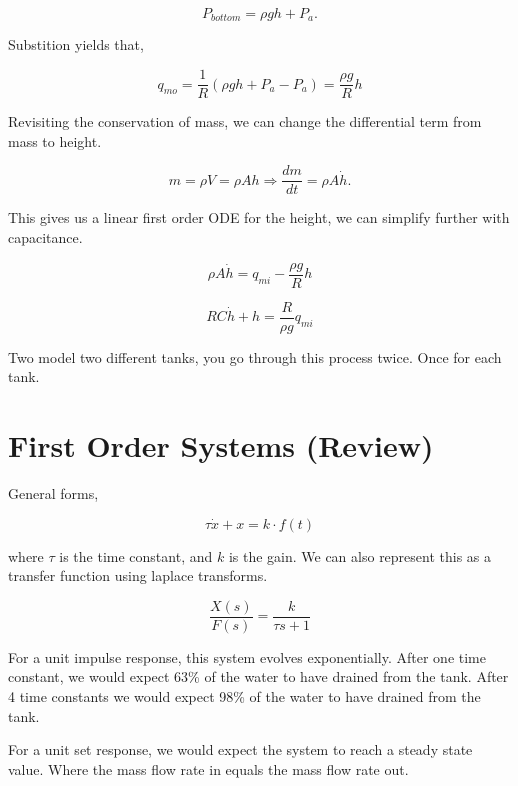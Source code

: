 \documentclass[12pt, a4paper]{report}
\begin{document}
  \[
      P_{bottom} = \rho gh + P_a
    .\]

  Substition yields that,

  \begin{equation}
    q_{mo} = \frac{1}{R} \left( \rho gh + P_a - P_a \right) = \frac{\rho g}{R}h
  \end{equation}

  Revisiting the conservation of mass, we can change the differential term from mass to height.

  \[
      m = \rho V = \rho Ah \Rightarrow \frac{dm}{dt} = \rho A \dot h
    .\]

  This gives us a linear first order ODE for the height, we can simplify further with capacitance.

  \begin{equation}
    \rho A \dot h = q_{mi} - \frac{\rho g}{R}h
  \end{equation}

  \begin{equation}
    RC \dot h + h = \frac{R}{\rho g}q_{mi}
  \end{equation}

  Two model two different tanks, you go through this process twice. Once for each tank.

  \section{First Order Systems (Review)}

  General forms,

  \begin{equation}
    \tau \dot x + x = k \cdot f(t)
  \end{equation}

  where $ \tau $ is the time constant, and $ k $ is the gain. We can also represent this as a transfer function using laplace transforms.

  \begin{equation}
    \frac{X(s)}{F(s)} = \frac{k}{\tau s + 1}
  \end{equation}

  For a unit impulse response, this system evolves exponentially. After one time constant, we would expect 63\% of the water to have drained from the tank. After 4 time constants we would expect 98\% of the water to have drained from the tank.

  For a unit set response, we would expect the system to reach a steady state value. Where the mass flow rate in equals the mass flow rate out.
\end{document}
